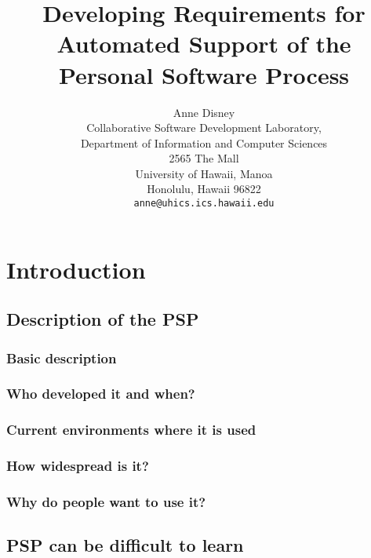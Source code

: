 



\title{Developing Requirements for Automated Support of the Personal Software Process}
\author{Anne Disney\\
Collaborative Software Development Laboratory,\\
Department of Information and Computer Sciences\\
2565 The Mall\\
University of Hawaii, Manoa\\
Honolulu, Hawaii   96822\\
{\tt anne@uhics.ics.hawaii.edu}}
\maketitle

\tableofcontents
\chapter{Introduction}
\section{Description of the PSP}

\subsection{Basic description}
\subsection{Who developed it and when?}
\subsection{Current environments where it is used}
\subsection{How widespread is it?}
\subsection{Why do people want to use it?}
\section{PSP can be difficult to learn}
